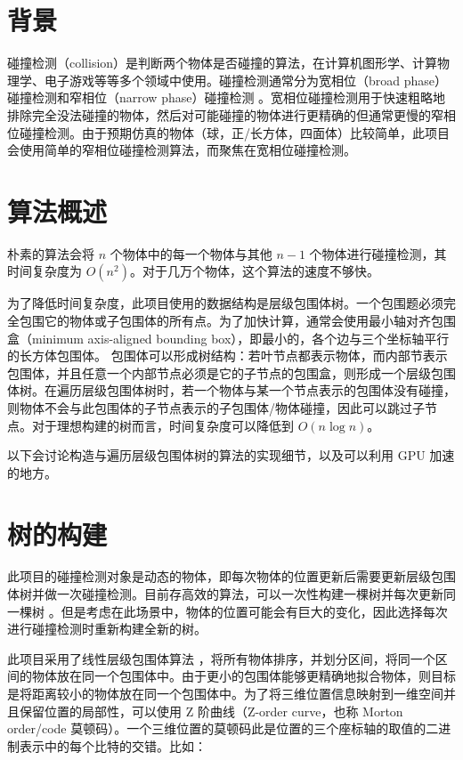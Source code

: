 \section{背景}

碰撞检测（collision）是判断两个物体是否碰撞的算法，在计算机图形学、计算物理学、电子游戏等等多个领域中使用。碰撞检测通常分为宽相位（broad phase）碰撞检测和窄相位（narrow phase）碰撞检测 \cite{nvidiaCollisionDetection}。宽相位碰撞检测用于快速粗略地排除完全没法碰撞的物体，然后对可能碰撞的物体进行更精确的但通常更慢的窄相位碰撞检测。由于预期仿真的物体（球，正/长方体，四面体）比较简单，此项目会使用简单的窄相位碰撞检测算法，而聚焦在宽相位碰撞检测。

\section{算法概述}

朴素的算法会将 $n$ 个物体中的每一个物体与其他 $n-1$ 个物体进行碰撞检测，其时间复杂度为 $O(n^2)$。对于几万个物体，这个算法的速度不够快。

为了降低时间复杂度，此项目使用的数据结构是层级包围体树。一个包围题必须完全包围它的物体或子包围体的所有点。为了加快计算，通常会使用最小轴对齐包围盒（minimum axis-aligned bounding box），即最小的，各个边与三个坐标轴平行的长方体包围体。
包围体可以形成树结构：若叶节点都表示物体，而内部节表示包围体，并且任意一个内部节点必须是它的子节点的包围盒，则形成一个层级包围体树。在遍历层级包围体树时，若一个物体与某一个节点表示的包围体没有碰撞，则物体不会与此包围体的子节点表示的子包围体/物体碰撞，因此可以跳过子节点。对于理想构建的树而言，时间复杂度可以降低到 $O(n\log n)$。

以下会讨论构造与遍历层级包围体树的算法的实现细节，以及可以利用 GPU 加速的地方。

\section{树的构建}

此项目的碰撞检测对象是动态的物体，即每次物体的位置更新后需要更新层级包围体树并做一次碰撞检测。目前存高效的算法，可以一次性构建一棵树并每次更新同一棵树 \cite{Wald2008}。但是考虑在此场景中，物体的位置可能会有巨大的变化，因此选择每次进行碰撞检测时重新构建全新的树。

此项目采用了线性层级包围体算法 \cite{Lauterbach2009}，将所有物体排序，并划分区间，将同一个区间的物体放在同一个包围体中。由于更小的包围体能够更精确地拟合物体，则目标是将距离较小的物体放在同一个包围体中。为了将三维位置信息映射到一维空间并且保留位置的局部性，可以使用 Z 阶曲线（Z-order curve，也称 Morton order/code 莫顿码）\cite{wikipediaZorderCurve}。一个三维位置的莫顿码此是位置的三个座标轴的取值的二进制表示中的每个比特的交错。比如：

